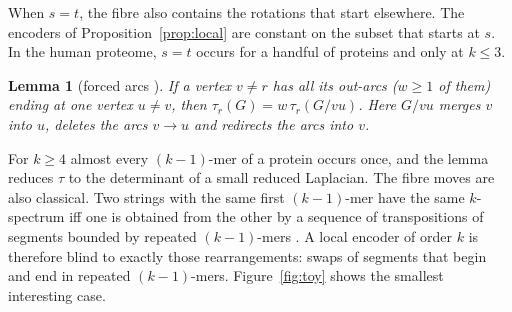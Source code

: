 \documentclass[11pt]{article}
\theoremstyle{plain}
\newtheorem{lemma}[theorem]{Lemma}
\theoremstyle{definition}
\theoremstyle{remark}
\begin{document}
When $s=t$, the fibre also contains the rotations that start elsewhere. The encoders of
Proposition~\ref{prop:local} are constant on the subset that starts at $s$. In the human proteome,
$s=t$ occurs for a handful of proteins and only at $k\le3$.

\begin{lemma}[forced arcs {\cite[Ch.~9, Lemma~9.7, p.~71]{AG}}]\label{lem:forced}
If a vertex $v\ne r$ has all its out-arcs ($w\ge1$ of them) ending at one vertex $u\ne v$, then
$\tau_r(G)=w\,\tau_r(G/vu)$. Here $G/vu$ merges $v$ into $u$, deletes the arcs $v\to u$ and redirects
the arcs into $v$.
\end{lemma}

For $k\ge4$ almost every $(k-1)$-mer of a protein occurs once, and the lemma reduces $\tau$ to the
determinant of a small reduced Laplacian. The fibre moves are also classical. Two strings with the
same first $(k-1)$-mer have the same $k$-spectrum iff one is obtained from the other by a sequence of
transpositions of segments bounded by repeated $(k-1)$-mers \cite{Ukk92,Pev95}. A local encoder of
order $k$ is therefore blind to exactly those rearrangements: swaps of segments that begin and end in
repeated $(k-1)$-mers. Figure~\ref{fig:toy} shows the smallest interesting case.
\end{document}
